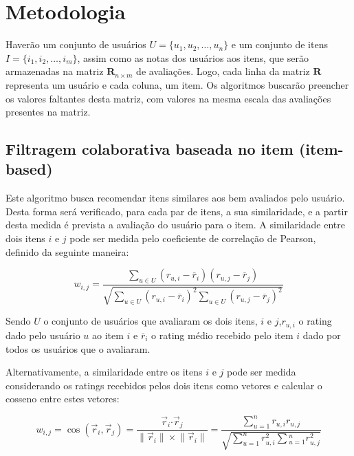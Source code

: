 \documentclass[12pt,a4paper,header]{abnt}
\begin{document}
\section{Metodologia}

Haverão um conjunto de usuários $U = \{u_1, u_2, \ldots, u_n\}$ e um conjunto de itens $I = \{i_1, i_2, \ldots, i_m \}$, assim como as notas dos usuários aos itens, que serão armazenadas na matriz $\boldsymbol{R}_{n \times m}$ de avaliações\cite{hahsler2015recommenderlab}. Logo, cada linha da matriz $\boldsymbol{R}$ representa um usuário e cada coluna, um item. Os algoritmos buscarão preencher os valores faltantes desta matriz, com valores na mesma escala das avaliações presentes na matriz\cite{takahashi2015estudo}.

\subsection{Filtragem colaborativa baseada no item (item-based)}

Este algoritmo busca recomendar itens similares aos bem avaliados pelo usuário. Desta forma será verificado, para cada par de itens, a sua similaridade, e a partir desta medida é prevista a avaliação do usuário para o item. A similaridade entre dois itens $i$ e $j$ pode ser medida pelo coeficiente de correlação de Pearson, definido da seguinte maneira\cite{melville2011recommender}:

\begin{equation}
w_{i, j} = \frac{\sum_{u \in U}{(r_{u, i} - \overline{r}_i ) ( r_{u, j} - \overline{r}_j )}}{\sqrt{\sum_{u \in U}{(r_{u, i} - \overline{r}_i )^2} \sum_{u \in U}{(r_{u, j} - \overline{r}_j )^2}}}
\end{equation}

Sendo $U$ o conjunto de usuários que avaliaram os dois itens, $i$ e $j$,$r_{u, i}$ o rating dado pelo usuário $u$ ao item $i$ e $\overline{r}_i$ o rating médio recebido pelo item $i$ dado por todos os usuários que o avaliaram.

Alternativamente, a similaridade entre os itens $i$ e $j$ pode ser medida considerando os ratings recebidos pelos dois itens como vetores e calcular o cosseno entre estes vetores\cite{sarwar2001item}:

\begin{equation}
w_{i, j} = \cos({\vec{r}_i, \vec{r}_j}) = \frac{\vec{r}_i \boldsymbol{\cdot} \vec{r}_j}{\lVert \vec{r}_i\rVert \times \lVert \vec{r}_i\rVert} = \frac{\sum_{u=1}^{n}{r_{u, i} r_{u, j}}}{\sqrt{\sum_{u=1}^{n}{r^2_{u, i}} \sum{_{u=1}^{n}{r^2_{u, j}}}}}
\end{equation}
\end{document}
